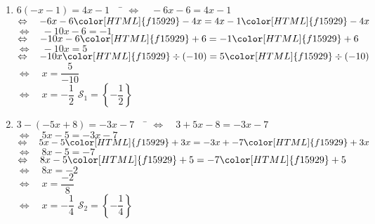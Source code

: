 \documentclass[a4paper,11pt,exos]{nsi} %
\begin{document}
\begin{enumerate}
    \item 	\begin{tabbing}
        $ 6(-x-1)=4x-1 \quad$		\=	$\Leftrightarrow\quad -6x-6=4x-1 $\\
        \>	$\Leftrightarrow\quad  	-6x-6{\color[HTML]{f15929}-4x}=4x-1{\color[HTML]{f15929}-4x} $\\
        \>	$\Leftrightarrow\quad	-10x-6=-1 $\\
        \>	$\Leftrightarrow\quad	-10x-6{\color[HTML]{f15929}+6}=-1{\color[HTML]{f15929}+6} $\\
        \>	$\Leftrightarrow\quad	-10x=5 $\\
        \>	$\Leftrightarrow\quad	-10x{\color[HTML]{f15929}\div(-10)}=5{\color[HTML]{f15929}\div(-10)} $\\
        \> 	$\Leftrightarrow\quad	x=\dfrac{5}{-10} $\\[.5em]
        \>	$\Leftrightarrow\quad	x=-\dfrac{1}{2} $ \hspace{4cm} $\mathcal{S}_1=\left\{ -\dfrac{1}{2} \right\}$
    \end{tabbing}

    \item 	\begin{tabbing}
        $ 3-(-5x+8)=-3x-7 \quad$		\=	$\Leftrightarrow\quad 3+5x-8=-3x-7 $\\
        \>	$\Leftrightarrow\quad  5x-5=-3x-7$\\
        \>	$\Leftrightarrow\quad	5x-5{\color[HTML]{f15929}+3x}=-3x+-7{\color[HTML]{f15929}+3x} $\\
        \>	$\Leftrightarrow\quad	8x-5=-7 $\\
        \>	$\Leftrightarrow\quad	8x-5{\color[HTML]{f15929}+5}=-7{\color[HTML]{f15929}+5} $\\
        \>	$\Leftrightarrow\quad	8x=-2$\\
        \>  $\Leftrightarrow\quad   x=\dfrac{-2}{8}$\\
        \>  $\Leftrightarrow\quad   x=-\dfrac{1}{4}$ \hspace{4cm} $\mathcal{S}_2=\left\{ -\dfrac{1}{4} \right\}$
    \end{tabbing}
    
    
            
    
    

\end{enumerate}
\end{document}

